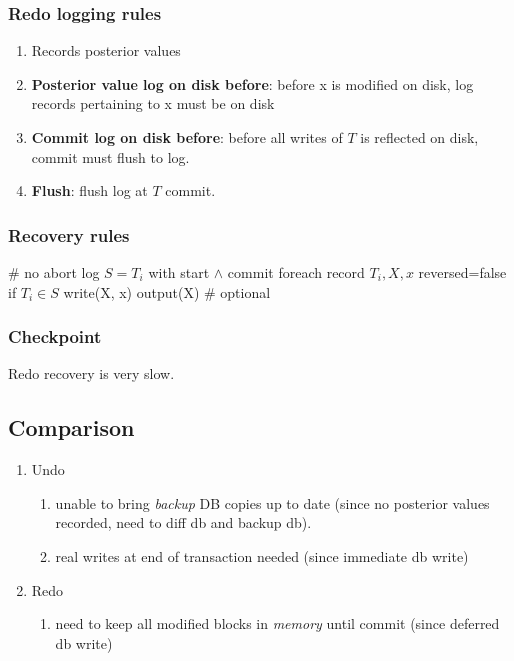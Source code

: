 \documentclass[a4paper]{report}
\begin{document}
\subsubsection{Redo logging rules}
\begin{enumerate}
\item Records posterior values
\item \textbf{Posterior value log on disk before}: before x is modified on disk, log records pertaining to x must be on disk
\item \textbf{Commit log on disk before}: before all writes of $T$ is reflected on disk, commit must flush to log.
\item \textbf{Flush}: flush log at $T$ commit. 
\end{enumerate}

\subsubsection{Recovery rules}
\begin{pseudo}
# no abort log
$S = T_i$ with start $\wedge$ commit
foreach record $T_i, X, x$ reversed=false
  if $T_i \in S$
    write(X, x)
    output(X) # optional
\end{pseudo}

\subsubsection{Checkpoint}
Redo recovery is very slow. 

\subsection*{Comparison}
\begin{enumerate}
\item Undo
\begin{enumerate}
\item unable to bring \textit{backup} DB copies up to date (since no posterior values recorded, need to diff db and backup db).
\item real writes at end of transaction needed (since immediate db write)
\end{enumerate}
\item Redo
\begin{enumerate}
\item need to keep all modified blocks in \textit{memory} until commit (since deferred db write)
\end{enumerate}
\end{enumerate}
\end{document}
